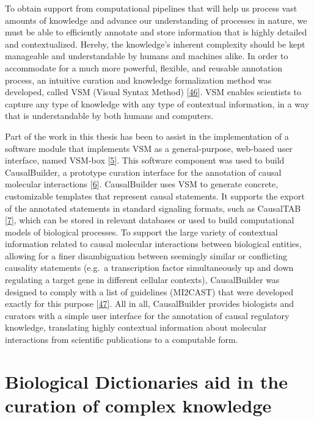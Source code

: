 \documentclass[
  12pt,
]{book}
\begin{document}
\newpage

To obtain support from computational pipelines that will help us process vast amounts of knowledge and advance our understanding of processes in nature, we must be able to efficiently annotate and store information that is highly detailed and contextualized.
Hereby, the knowledge's inherent complexity should be kept manageable and understandable by humans and machines alike.
In order to accommodate for a much more powerful, flexible, and reusable annotation process, an intuitive curation and knowledge formalization method was developed, called VSM (Visual Syntax Method) {[}\protect\hyperlink{ref-vsm-paper}{46}{]}.
VSM enables scientists to capture any type of knowledge with any type of contextual information, in a way that is understandable by both humans and computers.

Part of the work in this thesis has been to assist in the implementation of a software module that implements VSM as a general-purpose, web-based user interface, named VSM-box {[}\protect\hyperlink{ref-vsm-box}{5}{]}.
This software component was used to build CausalBuilder, a prototype curation interface for the annotation of causal molecular interactions {[}\protect\hyperlink{ref-Toure2021}{6}{]}.
CausalBuilder uses VSM to generate concrete, customizable templates that represent causal statements.
It supports the export of the annotated statements in standard signaling formats, such as CausalTAB {[}\protect\hyperlink{ref-Perfetto2019}{7}{]}, which can be stored in relevant databases or used to build computational models of biological processes.
To support the large variety of contextual information related to causal molecular interactions between biological entities, allowing for a finer disambiguation between seemingly similar or conflicting causality statements (e.g.~a transcription factor simultaneously up and down regulating a target gene in different cellular contexts), CausalBuilder was designed to comply with a list of guidelines (MI2CAST) that were developed exactly for this purpose {[}\protect\hyperlink{ref-Toure2020}{47}{]}.
All in all, CausalBuilder provides biologists and curators with a simple user interface for the annotation of causal regulatory knowledge, translating highly contextual information about molecular interactions from scientific publications to a computable form.

\newpage

\hypertarget{biological-dictionaries-aid-in-the-curation-of-complex-knowledge}{%
\section*{Biological Dictionaries aid in the curation of complex knowledge}\label{biological-dictionaries-aid-in-the-curation-of-complex-knowledge}}
\end{document}
